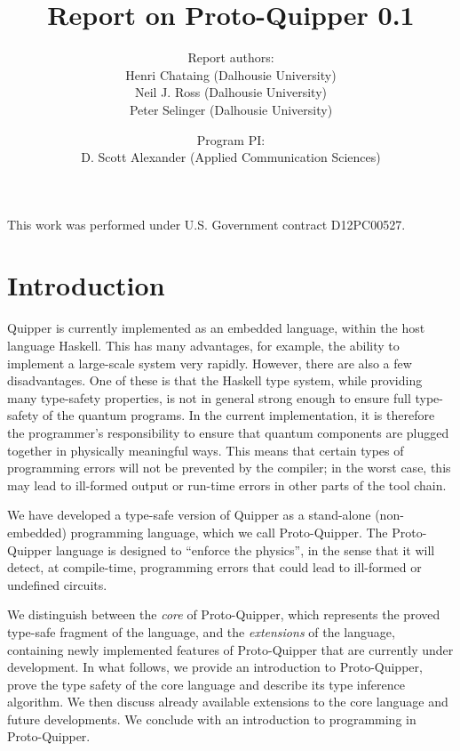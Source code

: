 \documentclass[twoside]{article}
\title{Report on Proto-Quipper 0.1}
\author{Report authors: \\
  Henri Chataing (Dalhousie University)\\
  Neil J. Ross (Dalhousie University)\\
  Peter Selinger (Dalhousie University)
}
\date{Program PI:\\
  D. Scott Alexander (Applied Communication Sciences)}
\begin{document}
\maketitle
\thispagestyle{fancy}

This work was performed under U.S. Government contract D12PC00527.

\tableofcontents

\clearpage
\section{Introduction}

Quipper is currently implemented as an embedded language, within 
the host language Haskell. This has many advantages, for example, 
the ability to implement a large-scale system very rapidly. However, 
there are also a few disadvantages. One of these is that the Haskell 
type system, while providing many  type-safety properties, is not in 
general strong enough to ensure full type-safety of the quantum 
programs. In the current implementation, it is therefore the 
programmer's responsibility to ensure that quantum components are 
plugged together in physically meaningful ways. This means that 
certain types of programming errors will not be prevented by the 
compiler; in the worst case, this may lead to ill-formed output or 
run-time errors in other parts of the tool chain.

We have developed a type-safe version of Quipper as a stand-alone 
(non-embedded) programming language, which we call Proto-Quipper. 
The Proto-Quipper language is designed to ``enforce the physics'', 
in the sense that it will detect, at compile-time, programming 
errors that could lead to ill-formed or undefined circuits. 

We distinguish between the \emph{core} of Proto-Quipper, which 
represents the proved type-safe fragment of the language, and 
the \emph{extensions} of the language, containing newly 
implemented features of Proto-Quipper that are currently under 
development. In what follows, we provide an introduction to 
Proto-Quipper, prove the type safety of the core language and 
describe its type inference algorithm. We then discuss already 
available extensions to the core language and future 
developments. We conclude with an introduction to programming 
in Proto-Quipper.


\clearpage
\end{document}
